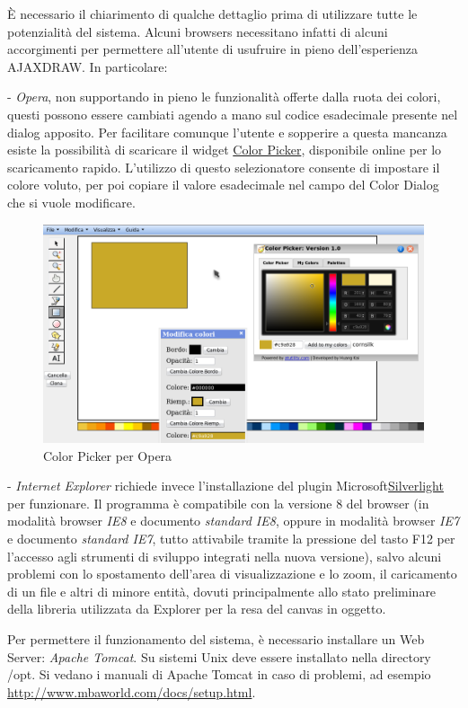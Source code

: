 \` E necessario il chiarimento di qualche dettaglio prima di utilizzare tutte le potenzialit\` a del sistema. Alcuni browsers necessitano infatti di alcuni accorgimenti per permettere all'utente di usufruire in pieno dell'esperienza AJAXDRAW. In particolare:
\begin{elencopuntato}[\normindent]
 \item[-] \hypertarget{Opera}{} \textit{Opera}, non supportando in pieno le funzionalit\` a offerte dalla ruota dei colori, questi possono essere cambiati agendo a mano sul codice esadecimale presente nel dialog apposito. Per facilitare comunque l'utente e sopperire a questa mancanza esiste la possibilit\` a di scaricare il widget \href{http://widgets.opera.com/widget/11822/}{Color Picker}, disponibile online per lo scaricamento rapido. L'utilizzo di questo selezionatore consente di impostare il colore voluto, per poi copiare il valore esadecimale nel campo del Color Dialog che si vuole modificare.
 
 \begin{figure}[!ht]
\centering
\includegraphics[scale=0.5]{images/opera.png}
\caption{Color Picker per Opera}
\end{figure} 

\item[-] \hypertarget{IEx}{} \textit{Internet Explorer} richiede invece l'installazione del plugin Microsoft\textcopyright   \href{http://silverlight.net/GetStarted/}{Silverlight \texttrademark} 
per funzionare. Il programma \`e compatibile con la versione 8 del browser (in modalit\` a browser \textit{IE8} e documento \textit{standard IE8}, oppure in modalit\` a browser \textit{IE7} e documento \textit{standard IE7}, tutto attivabile tramite la pressione del tasto F12 per l'accesso agli strumenti di sviluppo integrati nella nuova versione), salvo alcuni problemi con lo spostamento dell'area di visualizzazione e lo zoom, il caricamento di un file e altri di minore entit\` a, dovuti principalmente allo stato preliminare della libreria utilizzata da Explorer per la resa del canvas in oggetto.
\end{elencopuntato}
Per permettere il funzionamento del sistema, \`e necessario installare un Web Server: \textit{Apache Tomcat}. 
Su sistemi Unix deve essere installato nella  directory /opt. Si vedano i manuali di Apache Tomcat in caso di problemi, ad esempio \href{http://www.mbaworld.com/docs/setup.html}{http://www.mbaworld.com/docs/setup.html}.

